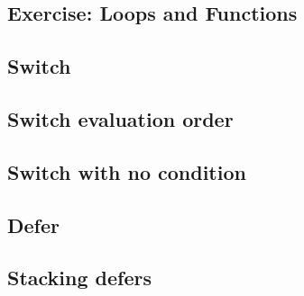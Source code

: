\subsection{Exercise: Loops and Functions}

% 
% 

\subsection{Switch}




\subsection{Switch evaluation order}




\subsection{Switch with no condition}




\subsection{Defer}




\subsection{Stacking defers}






